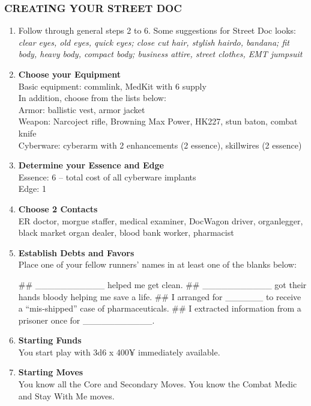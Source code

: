 \subsubsection{CREATING YOUR STREET DOC}
\begin{enumerate}
    \item Follow through general steps 2 to 6. Some suggestions for Street Doc looks: \textit{clear eyes, old eyes, quick eyes; close cut hair, stylish hairdo, bandana; fit body, heavy body, compact body; business attire, street clothes, EMT jumpsuit}
    
    \item \textbf{Choose your Equipment} \\
    Basic equipment: commlink, MedKit with 6 supply \\
    In addition, choose from the lists below: \\
    Armor: ballistic vest, armor jacket \\
    Weapon: Narcoject rifle, Browning Max Power, HK227, stun baton, combat knife \\
    Cyberware: cyberarm with 2 enhancements (2 essence), skillwires (2 essence) \\
    
    \item \textbf{Determine your Essence and Edge} \\
    Essence: 6 – total cost of all cyberware implants \\
    Edge: 1
    
    \item \textbf{Choose 2 Contacts} \\
    ER doctor, morgue staffer, medical examiner, DocWagon driver, organlegger, black market organ dealer, blood bank worker, pharmacist
    
    \item \textbf{Establish Debts and Favors} \\
    Place one of your fellow runners’ names in at least one of the blanks below:
        \begin{easylist}
            ## \_\_\_\_\_\_\_\_\_\_\_ helped me get clean.
            ## \_\_\_\_\_\_\_\_\_\_\_ got their hands bloody helping me save a life.
            ## I arranged for \_\_\_\_\_\_ to receive a “mis-shipped” case of pharmaceuticals.
            ## I extracted information from a prisoner once for \_\_\_\_\_\_\_\_\_\_\_.
        \end{easylist}
    
    \item \textbf{Starting Funds} \\
    You start play with 3d6 x 400¥ immediately available.
    
    \item \textbf{Starting Moves} \\
    You know all the Core and Secondary Moves. You know the Combat Medic and Stay With Me moves.
\end{enumerate}

